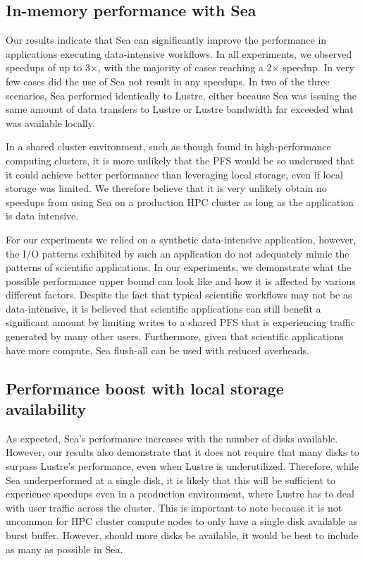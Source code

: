     \subsection{In-memory performance with Sea}
   
    Our results indicate that Sea can significantly improve the
    performance in applications executing data-intensive workflows. In all
    experiments, we observed speedups of up to 3$\times$, with the majority of
    cases reaching a 2$\times$ speedup. In very few cases did the use of Sea not
    result in any speedups. In two of the three scenarios, Sea performed
    identically to Lustre, either because Sea was issuing the same amount of
    data transfers to Lustre or Lustre bandwidth far exceeded what was available
    locally.

    In a shared cluster environment, such as though found in high-performance
    computing clusters, it is more unlikely that the PFS would be so underused
    that it could achieve better performance than leveraging local storage, even
    if local storage was limited. We therefore believe that it is very unlikely
    obtain no speedups from using Sea on a production HPC cluster as long as the application is data intensive.
    
    For our experiments we relied on a synthetic data-intensive application,
    however, the I/O patterns exhibited by such an application do not adequately
    mimic the patterns of scientific applications. In our experiments, we
    demonstrate what the possible performance upper bound can look like and how
    it is affected by various different factors. Despite the fact that typical
    scientific workflows may not be as data-intensive, it is believed that scientific 
    applications can still benefit a significant amount by limiting writes to a shared
    PFS that is experiencing traffic generated by many other users. Furthermore,
    given that scientific applications have more compute, Sea flush-all can be used
    with reduced overheads.

    \subsection{Performance boost with local storage availability}

    As expected, Sea's performance increases with the number of disks available.
    However, our results also demonstrate that it does not require that many disks
    to surpass Lustre's performance, even when Lustre is underutilized. Therefore,
    while Sea underperformed at a single disk, it is likely that this will be sufficient
    to experience speedups even in a production environment, where Lustre has to 
    deal with user traffic across the cluster. This is important to note because it
    is not uncommon for HPC cluster compute nodes to only have a single disk available
    as burst buffer. However, should more disks be available, it would be best to include
    as many as possible in Sea.

